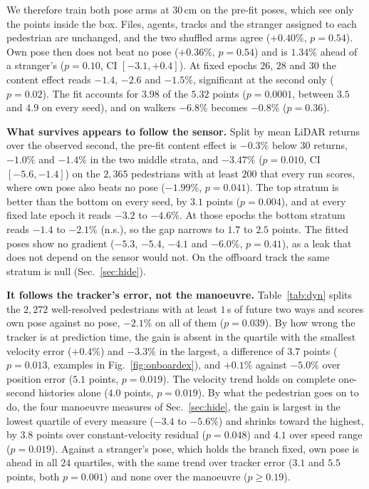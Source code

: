 \documentclass[conference]{IEEEtran}
\begin{document}
We therefore train both pose arms at $30$\,cm on the pre-fit poses, which see
only the points inside the box. Files, agents, tracks and the stranger assigned
to each pedestrian are unchanged, and the two shuffled arms agree ($+0.40\%$,
$p{=}0.54$). Own pose then does not beat no pose ($+0.36\%$, $p{=}0.54$) and is $1.34\%$
ahead of a stranger's ($p{=}0.10$, CI $[-3.1,+0.4]$). At fixed epochs $26$,
$28$ and $30$ the content effect reads $-1.4$, $-2.6$ and $-1.5\%$, significant at the second
only ($p{=}0.02$). The fit
accounts for $3.98$ of the $5.32$ points ($p{=}0.0001$, between $3.5$ and $4.9$
on every seed), and on walkers $-6.8\%$ becomes $-0.8\%$ ($p{=}0.36$).

\textbf{What survives appears to follow the sensor.} Split by mean LiDAR returns over the
observed second, the pre-fit content effect is $-0.3\%$ below $30$ returns,
$-1.0\%$ and $-1.4\%$ in the two middle strata, and $-3.47\%$ ($p{=}0.010$, CI
$[-5.6,-1.4]$) on the $2{,}365$ pedestrians with at least $200$ that every run scores, where own pose also
beats no pose ($-1.99\%$, $p{=}0.041$). The top stratum is better than the
bottom on every seed, by $3.1$ points ($p{=}0.004$), and at every fixed late
epoch it reads $-3.2$ to $-4.6\%$. At those epochs the bottom stratum reads
$-1.4$ to $-2.1\%$ (n.s.), so the gap narrows to $1.7$ to $2.5$ points. The fitted poses show no gradient ($-5.3$,
$-5.4$, $-4.1$ and $-6.0\%$, $p{=}0.41$), as a leak that does not depend on the
sensor would not. On the offboard track the same stratum is null
(Sec.~\ref{sec:hide}).

\textbf{It follows the tracker's error, not the manoeuvre.}
Table~\ref{tab:dyn} splits the $2{,}272$ well-resolved pedestrians with at least
$1$\,s of future two ways and scores own pose against no pose, $-2.1\%$ on all
of them ($p{=}0.039$). By how wrong the tracker is at prediction time, the gain
is absent in the quartile with the smallest velocity error ($+0.4\%$) and
$-3.3\%$ in the largest, a difference of $3.7$ points ($p{=}0.013$,
examples in Fig.~\ref{fig:onboardex}), and
$+0.1\%$ against $-5.0\%$ over position error ($5.1$ points, $p{=}0.019$). The velocity trend holds
on complete one-second histories alone ($4.0$ points, $p{=}0.019$). By what
the pedestrian goes on to do, the four manoeuvre measures of
Sec.~\ref{sec:hide}, the gain is largest in the lowest quartile of every
measure ($-3.4$ to $-5.6\%$) and shrinks toward the highest, by $3.8$ points
over constant-velocity residual ($p{=}0.048$) and $4.1$ over speed range
($p{=}0.019$). Against a stranger's pose, which holds the branch fixed, own
pose is ahead in all $24$ quartiles, with the same trend over tracker error
($3.1$ and $5.5$ points, both $p{=}0.001$) and none over the manoeuvre
($p\ge0.19$).
\end{document}
